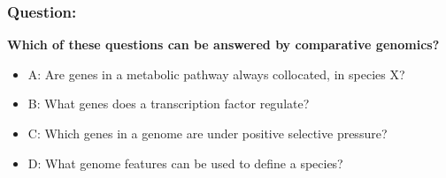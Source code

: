 
%
\begin{frame}
  \frametitle{Question:}
  \textcolor{hutton_green}{\textbf{Which of these questions can be answered by comparative genomics?}}
  \begin{itemize}
    \item A: Are genes in a metabolic pathway always collocated, in species X?
    \item B: What genes does a transcription factor regulate?
    \item C: Which genes in a genome are under positive selective pressure?
    \item D: What genome features can be used to define a species?
  \end{itemize}
\end{frame}